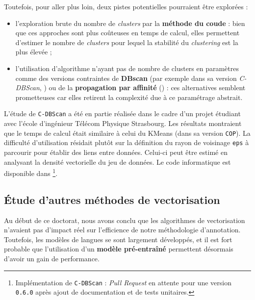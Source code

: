 		Toutefois, pour aller plus loin, deux pistes potentielles pourraient être explorées :
		\begin{itemize}
			\item l'exploration brute du nombre de \textit{clusters} par la \textbf{méthode du coude} : bien que ces approches sont plus coûteuses en temps de calcul, elles permettent d'estimer le nombre de \textit{clusters} pour lequel la stabilité du \textit{clustering} est la plus élevée ;
			\item l'utilisation d'algorithme n'ayant pas de nombre de clusters en paramètres comme des versions contraintes de \textbf{DBscan} (par exemple dans sa version \textit{C-DBScan}, \cite{ruiz-etal:2010:densitybased-semisupervised-clustering}) ou de la \textbf{propagation par affinité} (\cite{givoni-frey:2009:semisupervised-affinity-propagation}) : ces alternatives semblent prometteuses car elles retirent la complexité due à ce paramétrage abstrait.
		\end{itemize}
		
		\begin{leftBarInformation}
			L'étude de \texttt{C-DBScan} a été en partie réalisée dans le cadre d'un projet étudiant avec l'école d'ingénieur Télécom Physique Strasbourg.
			Les résultats montraient que le temps de calcul était similaire à celui du KMeans (dans sa version \texttt{COP}).
			La difficulté d'utilisation résidait plutôt sur la définition du rayon de voisinage \texttt{eps} à parcourir pour établir des liens entre données.
			Celui-ci peut être estimé en analysant la densité vectorielle du jeu de données.
			Le code informatique est disponible dans \cite{schild:2022:cognitivefactory-interactiveclustering} \footnote{
				Implémentation de \texttt{C-DBScan} : \textit{Pull Request} en attente pour une version \texttt{0.6.0} après ajout de documentation et de tests unitaires.
			}.
		\end{leftBarInformation}
	
	
	\subsection{Étude d'autres méthodes de vectorisation}
	\label{section:4.7.2-HYPOTHESES-NON-VERIFIEES-VECTORISATION}
	
		Au début de ce doctorat, nous avons conclu que les algorithmes de vectorisation n'avaient pas d'impact réel sur l'efficience de notre méthodologie d'annotation.
		Toutefois, les modèles de langues se sont largement développés, et il est fort probable que l'utilisation d'un \textbf{modèle pré-entraîné} permettent désormais d'avoir un gain de performance.
		
